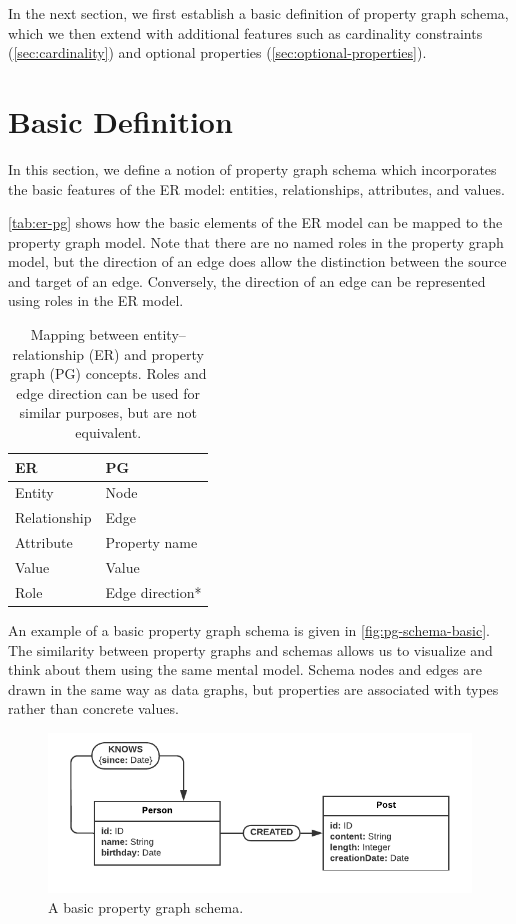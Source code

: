 \documentclass{report}
\theoremstyle{definition}
\begin{document}
In the next section, we first establish a basic definition of property graph schema, which we then extend with additional features such as cardinality constraints (\autoref{sec:cardinality}) and optional properties (\autoref{sec:optional-properties}).

\section{Basic Definition}

In this section, we define a notion of property graph schema which incorporates the basic features of the ER model: entities, relationships, attributes, and values.

\autoref{tab:er-pg} shows how the basic elements of the ER model can be mapped to the property graph model. Note that there are no named roles in the property graph model, but the direction of an edge does allow the distinction between the source and target of an edge. Conversely, the direction of an edge can be represented using roles in the ER model.

\begin{table}[t]
  \centering
  \begin{tabular}{ll}
    \hline
    \textbf{ER}  & \textbf{PG}     \\
    \hline
    Entity       & Node            \\
    Relationship & Edge            \\
    Attribute    & Property name   \\
    Value        & Value           \\
    Role         & Edge direction* \\
    \hline
  \end{tabular}
  \caption[Mapping between entity--relationship and property graph concepts]{Mapping between entity--relationship (ER) and property graph (PG) concepts. Roles and edge direction can be used for similar purposes, but are not equivalent.}
  \label{tab:er-pg}
\end{table}

An example of a basic property graph schema is given in \autoref{fig:pg-schema-basic}. The similarity between property graphs and schemas allows us to visualize and think about them using the same mental model. Schema nodes and edges are drawn in the same way as data graphs, but properties are associated with types rather than concrete values.

\begin{figure}[t]
  \centering
  \includegraphics{figures/pg-schema-basic.pdf}
  \caption{A basic property graph schema.}
  \label{fig:pg-schema-basic}
\end{figure}
\end{document}

